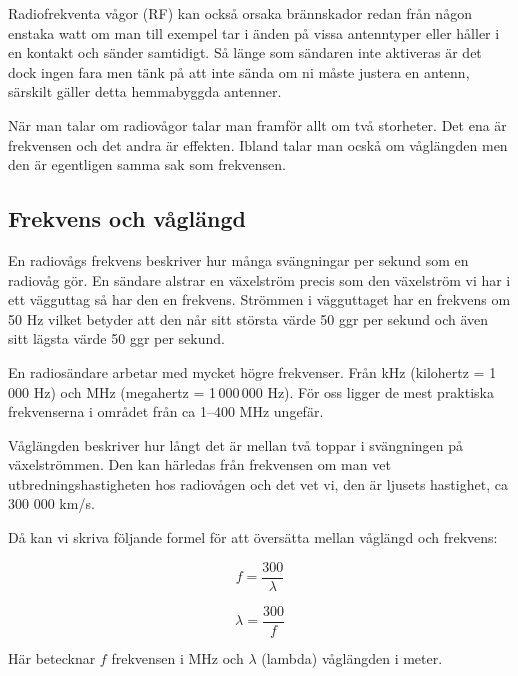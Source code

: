 \documentclass[12ypt,swedish,a4paper]{report}
\begin{document}
Radiofrekventa vågor (RF) kan också orsaka brännskador redan från någon enstaka watt om man till exempel tar i änden på vissa antenntyper eller håller i en kontakt och sänder samtidigt. Så länge som sändaren inte aktiveras är det dock ingen fara men tänk på att inte sända om ni måste justera en antenn, särskilt gäller detta hemmabyggda antenner.

När man talar om radiovågor talar man framför allt om två storheter. Det ena är frekvensen och det andra är effekten. Ibland talar man ocskå om våglängden men den är egentligen samma sak som frekvensen.

\subsection{Frekvens och våglängd}

En radiovågs frekvens beskriver hur många svängningar per sekund som en radiovåg gör. En sändare alstrar en växelström precis som den växelström vi har i ett vägguttag så har den en frekvens. Strömmen i vägguttaget har en frekvens om 50 Hz vilket betyder att den når sitt största värde 50 ggr per sekund och även sitt lägsta värde 50 ggr per sekund. 

En radiosändare arbetar med mycket högre frekvenser. Från kHz (kilohertz = 1\,000 Hz) och MHz (megahertz = 1\,000\,000 Hz). För oss ligger de mest praktiska frekvenserna i området från ca 1--400 MHz ungefär.

Våglängden beskriver hur långt det är mellan två toppar i svängningen på växelströmmen. Den kan härledas från frekvensen om man vet utbredningshastigheten hos radiovågen och det vet vi, den är ljusets hastighet, ca 300 000 km/s.

Då kan vi skriva följande formel för att översätta mellan våglängd och frekvens:

\begin{equation}
f = \frac{300}{\lambda}
\end{equation}

\begin{equation}
\lambda = \frac{300}{f}
\end{equation}

Här betecknar $f$ frekvensen i MHz och $\lambda$ (lambda) våglängden i meter. 
\end{document}

